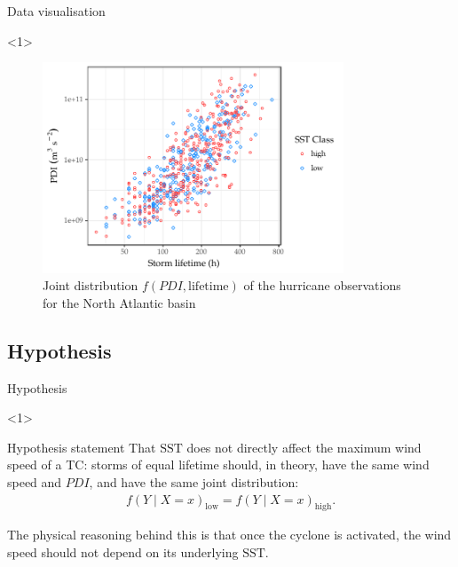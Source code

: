 \begin{frame}{Data visualisation}
	\begin{onlyenv}
		\begin{figure}[H]
			\centering
			\includegraphics[width=0.8\textwidth]{images/natl-bvln}
			\caption{Joint distribution $f(PDI, \text{lifetime})$ of the hurricane observations for the North Atlantic basin}
			\label{fig:natl-bvln}
		\end{figure}
	\end{onlyenv}
\end{frame}

\subsection{Hypothesis}
\begin{frame}[label=intro-hypothesis, allowframebreaks]{Hypothesis}
	\begin{onlyenv}
		\begin{block}{Hypothesis statement}
			That $\text{SST}$ does not directly affect the maximum wind speed of a TC: storms of equal lifetime should, in theory, have the same wind speed and $PDI$, and have the same joint distribution:
			\begin{align}\label{eq:hypothesis}
				f(Y \mid X = x)_{\text{low}} = f(Y \mid X = x)_{\text{high}} .
			\end{align}
		\end{block}

		The physical reasoning behind this is that once the cyclone is activated, the wind speed should not depend on its underlying $\text{SST}$.
	\end{onlyenv}
\end{frame}

